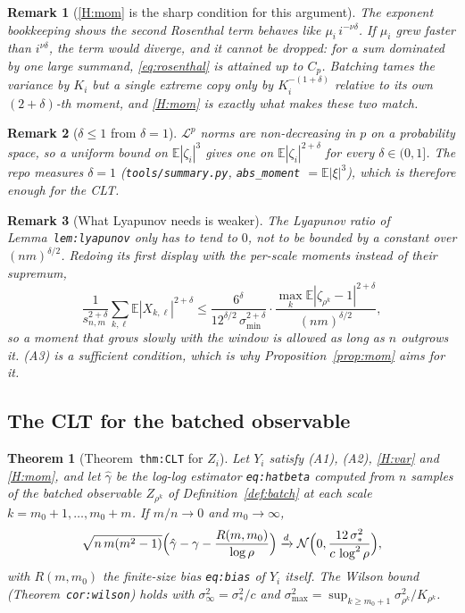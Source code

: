 \documentclass[11pt]{article}
\newtheorem{theorem}{Theorem}
\newtheorem{remark}{Remark}
\newcommand{\E}{\mathbb{E}}
\newcommand{\dto}{\xrightarrow{d}}
\newcommand{\lbl}[1]{\texttt{#1}}
\begin{document}
\begin{remark}[\ref{H:mom} is the sharp condition for this argument]
The exponent bookkeeping shows the second Rosenthal term behaves like
$\mu_i\,i^{-\nu\delta}$. If $\mu_i$ grew faster than $i^{\nu\delta}$, the
term would diverge, and it cannot be dropped: for a sum dominated by one
large summand, \eqref{eq:rosenthal} is attained up to $C_p$. Batching tames
the \emph{variance} by $K_i$ but a single extreme copy only by $K_i^{-(1+\delta)}$
relative to its own $(2+\delta)$-th moment, and \ref{H:mom} is exactly what
makes these two match.
\end{remark}

\begin{remark}[$\delta\le1$ from $\delta=1$]
$\mathcal L^p$ norms are non-decreasing in $p$ on a probability space, so a
uniform bound on $\E|\zeta_i|^{3}$ gives one on $\E|\zeta_i|^{2+\delta}$ for
every $\delta\in(0,1]$. The repo measures $\delta=1$
(\texttt{tools/summary.py}, \texttt{abs\_moment} $=\E|\xi|^{3}$), which is
therefore enough for the CLT.
\end{remark}

\begin{remark}[What Lyapunov needs is weaker]
The Lyapunov ratio of Lemma~\lbl{lem:lyapunov} only has to tend to $0$, not to
be bounded by a constant over $(nm)^{\delta/2}$. Redoing its first display
with the per-scale moments instead of their supremum,
\[
  \frac{1}{s_{n,m}^{2+\delta}}\sum_{k,\ell}\E|X_{k,\ell}|^{2+\delta}
  \le\frac{6^\delta}{12^{\delta/2}\,\sigma_{\min}^{2+\delta}}
  \cdot\frac{\max_{k}\E|\zeta_{\rho^k}-1|^{2+\delta}}{(nm)^{\delta/2}},
\]
so a moment that grows slowly with the window is allowed as long as
$n$ outgrows it. (A3) is a sufficient condition, which is why
Proposition~\ref{prop:mom} aims for it.
\end{remark}

\subsection{The CLT for the batched observable}

\begin{theorem}[Theorem~\lbl{thm:CLT} for $Z_i$]\label{thm:batch}
Let $Y_i$ satisfy (A1), (A2), \ref{H:var} and \ref{H:mom}, and let $\hat\gamma$
be the log-log estimator \lbl{eq:hatbeta} computed from $n$ samples of the
batched observable $Z_{\rho^k}$ of Definition~\ref{def:batch} at each scale
$k=m_0+1,\dots,m_0+m$. If $m/n\to0$ and $m_0\to\infty$,
\[
  \sqrt{n\,m(m^2-1)}\Bigl(\hat\gamma-\gamma-\frac{R(m,m_0)}{\log\rho}\Bigr)
  \dto\mathcal N\Bigl(0,\frac{12\,\sigma_*^2}{c\,\log^2\rho}\Bigr),
\]
with $R(m,m_0)$ the finite-size bias \lbl{eq:bias} of $Y_i$ itself. The Wilson
bound (Theorem~\lbl{cor:wilson}) holds with $\sigma_\infty^2=\sigma_*^2/c$ and
$\sigma_{\max}^2=\sup_{k\ge m_0+1}\sigma_{\rho^k}^2/K_{\rho^k}$.
\end{theorem}
\end{document}

